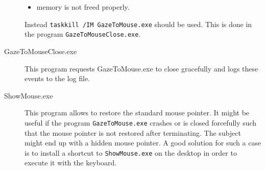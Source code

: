 \documentclass[a4paper,oneside]{book}
\begin{document}
\begin{description}
\begin{itemize}
            \item memory is not freed properly.
        \end{itemize}
        Instead \texttt{taskkill /IM GazeToMouse.exe} should be used.
        This is done in the program \texttt{GazeToMouseClose.exe}.
    \item[GazeToMouseClose.exe] This program requests GazeToMouse.exe to close gracefully and logs these events to the log file.
    \item[ShowMouse.exe] This program allows to restore the standard mouse pointer.
        It might be useful if the program \texttt{GazeToMouse.exe} crashes or is closed forcefully such that the mouse pointer is not restored after terminating.
        The subject might end up with a hidden mouse pointer.
        A good solution for such a case is to install a shortcut to \texttt{ShowMouse.exe} on the desktop in order to execute it with the keyboard.
\end{description}
\end{document}
